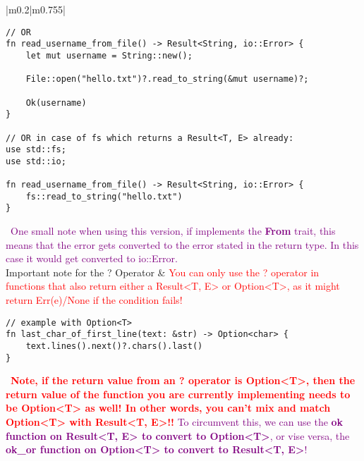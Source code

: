 \documentclass[main.tex,fontsize=8pt,paper=a4,paper=portrait,DIV=calc,]{scrartcl}
\begin{document}
\begin{table}[ht!]
\begin{tabular}{|m{0.2\linewidth}|m{0.755\linewidth}|}
\begin{lstlisting}
// OR
fn read_username_from_file() -> Result<String, io::Error> {
    let mut username = String::new();

    File::open("hello.txt")?.read_to_string(&mut username)?;

    Ok(username)
}

// OR in case of fs which returns a Result<T, E> already:
use std::fs;
use std::io;

fn read_username_from_file() -> Result<String, io::Error> {
    fs::read_to_string("hello.txt")
}
\end{lstlisting} 
\, \newline
\textcolor{purple}{One small note when using this version, if implements the \textbf{From} trait, this means that the error gets converted to the error stated in the return type.\newline
In this case it would get converted to io::Error.}\\
\hline
Important note for the ? Operator & 
\textcolor{red}{You can only use the ? operator in functions that also return either a Result<T, E> or Option<T>, as it might return Err(e)/None if the condition fails!}\newline
\begin{lstlisting}
// example with Option<T>
fn last_char_of_first_line(text: &str) -> Option<char> {
    text.lines().next()?.chars().last()
}
\end{lstlisting}
\, \newline
\textcolor{red}{\textbf{Note, if the return value from an ? operator is Option<T>, then the return value of the function you are currently implementing needs to be Option<T> as well!\newline
In other words, you can't mix and match Option<T> with Result<T, E>!!}}\newline
\textcolor{purple}{To circumvent this, we can use the \textbf{ok function on Result<T, E> to convert to Option<T>}, or vise versa, the \textbf{ok\_or function on Option<T> to convert to Result<T, E>}!}\\
\hline
\end{tabular}
\end{table}
\pagebreak
\end{document}
